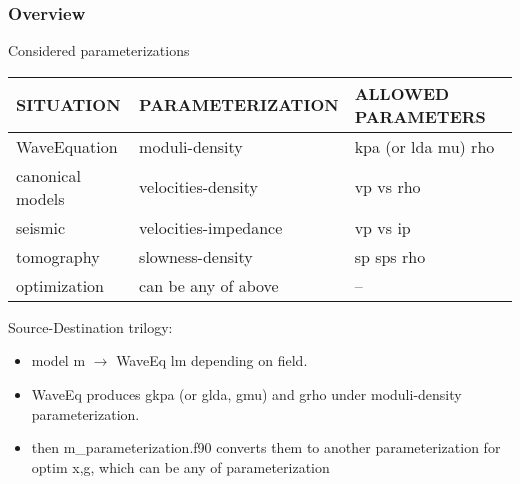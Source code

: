 \documentclass[9pt]{beamer}
\begin{document}
\begin{frame}\frametitle{Overview}
  
  \begin{block}{Considered parameterizations}
  \begin{tabular}{lll}
    \hline
    SITUATION    & PARAMETERIZATION & ALLOWED PARAMETERS \\
    \hline
    WaveEquation & moduli-density   & kpa (or lda mu) rho \\
    canonical models   & velocities-density & vp vs rho \\
    seismic      & velocities-impedance & vp vs ip \\
    tomography   & slowness-density     & sp sps rho \\
    optimization & can be any of above & --\\
    \hline
  \end{tabular} 
  \end{block} 

  \begin{block}{Source-Destination trilogy:}
    \centering {}
    
    \begin{itemize}
      \item model m $\rightarrow$ WaveEq lm depending on field.
      \item WaveEq produces gkpa (or glda, gmu) and grho under moduli-density parameterization.
      \item then m\_parameterization.f90 converts them to another parameterization for optim x,g, which can be any of parameterization
    \end{itemize}
  \end{block}
  
\end{frame}
\end{document}
